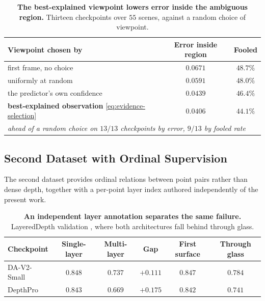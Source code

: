 \documentclass{article} %
\theoremstyle{defstyle}
\theoremstyle{plain}
\begin{document}
\begin{table}[!ht]
\caption{\textbf{The best-explained viewpoint lowers error inside the ambiguous region.} Thirteen
checkpoints over $55$ scenes, against a random choice of viewpoint.}
\label{tab:supp-viewpoint}
\begin{center}
\footnotesize
\begin{tabular}{lcc}
\toprule
\textbf{Viewpoint chosen by} & \textbf{Error inside region} & \textbf{Fooled} \\
\midrule
first frame, no choice          & $0.0671$ & $48.7\%$ \\
uniformly at random             & $0.0591$ & $48.0\%$ \\
the predictor's own confidence  & $0.0439$ & $46.4\%$ \\
\textbf{best-explained observation} \eqref{eq:evidence-selection} & $\mathbf{0.0406}$ & $\mathbf{44.1\%}$ \\
\midrule
\multicolumn{3}{l}{\emph{ahead of a random choice on $13/13$ checkpoints by error, $9/13$ by fooled rate}} \\
\bottomrule
\end{tabular}
\end{center}
\end{table}

\subsection{Second Dataset with Ordinal Supervision}
\label{sec:supp-layered}

The second dataset provides ordinal relations between point pairs rather than dense depth,
together with a per-point layer index authored independently of the present work.

\begin{table}[!ht]
\caption{\textbf{An independent layer annotation separates the same failure.} LayeredDepth
validation \citep{layereddepth2025}, where both architectures fall behind through glass.}
\label{tab:supp-layered}
\begin{center}
\footnotesize
\begin{tabular}{lccccc}
\toprule
\textbf{Checkpoint} & \textbf{Single-layer} & \textbf{Multi-layer} &
\textbf{Gap} & \textbf{First surface} & \textbf{Through glass} \\
\midrule
DA-V2-Small & $0.848$ & $0.737$ & $\mathbf{+0.111}$ & $0.847$ & $0.784$ \\
DepthPro    & $0.843$ & $0.669$ & $\mathbf{+0.175}$ & $0.842$ & $0.741$ \\
\bottomrule
\end{tabular}
\end{center}
\end{table}
\end{document}
